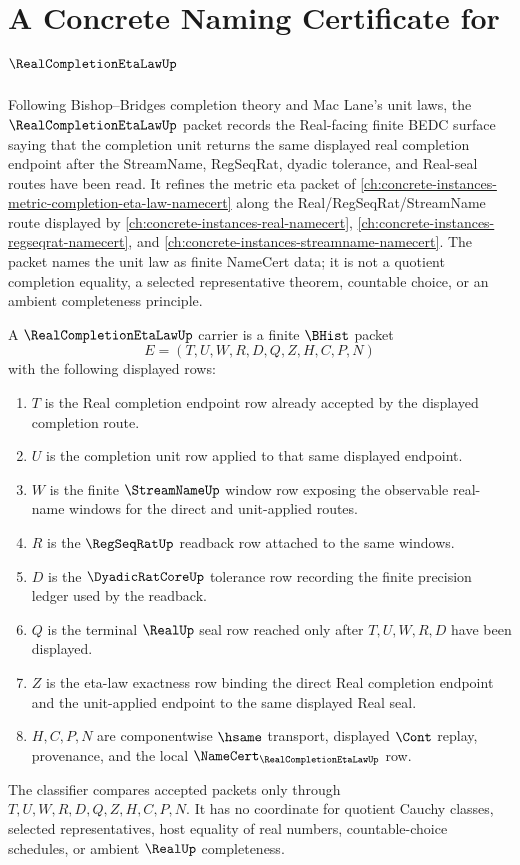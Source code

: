 \chapter{A Concrete Naming Certificate for $\RealCompletionEtaLawUp$}
\label{ch:concrete-instances-real-completion-eta-law-namecert}

Following Bishop--Bridges completion theory and Mac Lane's unit laws, the $\RealCompletionEtaLawUp$ packet records the Real-facing finite BEDC surface saying that the completion unit returns the same displayed real completion endpoint after the StreamName, RegSeqRat, dyadic tolerance, and Real-seal routes have been read. It refines the metric eta packet of \autoref{ch:concrete-instances-metric-completion-eta-law-namecert} along the Real/RegSeqRat/StreamName route displayed by \autoref{ch:concrete-instances-real-namecert}, \autoref{ch:concrete-instances-regseqrat-namecert}, and \autoref{ch:concrete-instances-streamname-namecert}. The packet names the unit law as finite NameCert data; it is not a quotient completion equality, a selected representative theorem, countable choice, or an ambient completeness principle.

\begin{definition}
\label{def:real-completion-eta-law-carrier}
A $\RealCompletionEtaLawUp$ carrier is a finite $\BHist$ packet
$$
E=(T,U,W,R,D,Q,Z,H,C,P,N)
$$
with the following displayed rows:
\begin{enumerate}
\item $T$ is the Real completion endpoint row already accepted by the displayed completion route.
\item $U$ is the completion unit row applied to that same displayed endpoint.
\item $W$ is the finite $\StreamNameUp$ window row exposing the observable real-name windows for the direct and unit-applied routes.
\item $R$ is the $\RegSeqRatUp$ readback row attached to the same windows.
\item $D$ is the $\DyadicRatCoreUp$ tolerance row recording the finite precision ledger used by the readback.
\item $Q$ is the terminal $\RealUp$ seal row reached only after $T,U,W,R,D$ have been displayed.
\item $Z$ is the eta-law exactness row binding the direct Real completion endpoint and the unit-applied endpoint to the same displayed Real seal.
\item $H,C,P,N$ are componentwise $\hsame$ transport, displayed $\Cont$ replay, provenance, and the local $\NameCert_{\RealCompletionEtaLawUp}$ row.
\end{enumerate}
The classifier compares accepted packets only through $T,U,W,R,D,Q,Z,H,C,P,N$. It has no coordinate for quotient Cauchy classes, selected representatives, host equality of real numbers, countable-choice schedules, or ambient $\RealUp$ completeness.
\end{definition}

